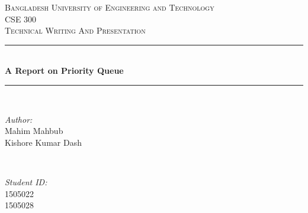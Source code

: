 \documentclass{report}
\begin{document}
\begin{titlepage}

\newcommand{\HRule}{\rule{\linewidth}{0.5mm}} %

\center %
 

\textsc{\large Bangladesh University of Engineering and Technology}\\[1.5cm] %
\textsc{\Large CSE 300}\\[0.5cm] %
\textsc{\large Technical Writing And Presentation}\\[0.5cm] %


\HRule \\[0.4cm]
{ \huge \bfseries A Report on Priority Queue}\\[0.4cm] %
\HRule \\[1.5cm]
 

\begin{minipage}{0.4\textwidth}
\begin{flushleft} \large
\emph{Author:}\\
Mahim Mahbub\\
Kishore Kumar Dash
\end{flushleft}
\end{minipage}
~
\begin{minipage}{0.4\textwidth}
\begin{flushright} \large
\emph{Student ID:} \\
1505022\\
1505028%
\end{flushright}
\end{minipage}\\[2cm]


\end{titlepage}
\end{document}
